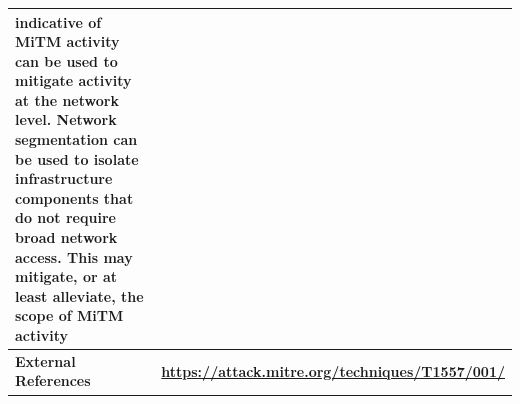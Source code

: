 {\begin{table}[h!]
\begin{tabular}{|p{3cm}|p{15cm}|}
{indicative of MiTM activity can be used to mitigate activity at the network level.
 Network segmentation can be used to isolate infrastructure components that do not
require broad network access. This may mitigate, or at least alleviate, the scope of
MiTM activity} \\
        \hline
        \rowcolor{TableBgRowIntemediaColor}        
        \cellcolor{LowVulnColor} \textbf{External References} & 
        \textbf{\url{https://attack.mitre.org/techniques/T1557/001/}} \\
        \hline
    \end{tabular}
\end{table}

}

